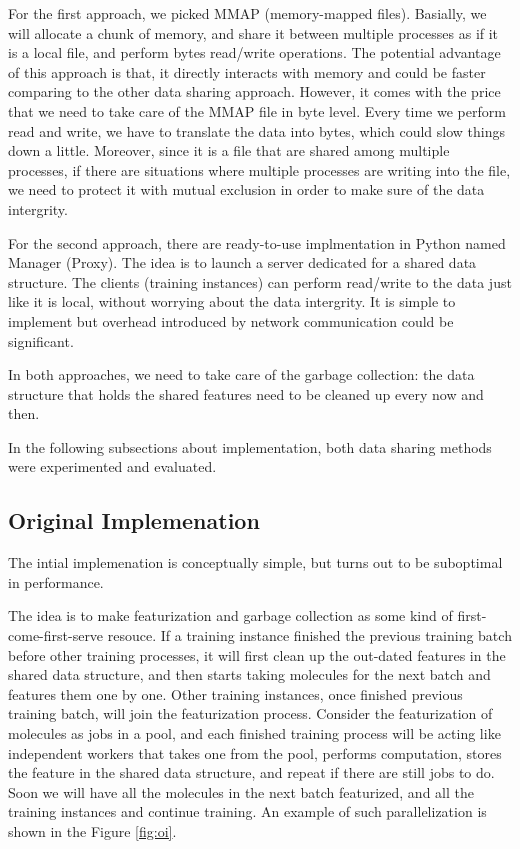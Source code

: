 \documentclass[conference]{IEEEtran}
\begin{document}
For the first approach, we picked MMAP (memory-mapped files). 
Basially, we will allocate a chunk of memory, and share it between multiple processes as if it is a local file, and perform bytes read/write operations. 
The potential advantage of this approach is that, it directly interacts with memory and could be faster comparing to the other data sharing approach. 
However, it comes with the price that we need to take care of the MMAP file in byte level. Every time we perform read and write, we have to translate the data into bytes, which could slow things down a little. 
Moreover, since it is a file that are shared among multiple processes, if there are situations where multiple processes are writing into the file, we need to protect it with mutual exclusion in order to make sure of the data intergrity. 

For the second approach, there are ready-to-use implmentation in Python named Manager (Proxy). 
The idea is to launch a server dedicated for a shared data structure. 
The clients (training instances) can perform read/write to the data just like it is local, without worrying about the data intergrity. 
It is simple to implement but overhead introduced by network communication could be significant. 

In both approaches, we need to take care of the garbage collection: the data structure that holds the shared features need to be cleaned up every now and then.

In the following subsections about implementation, both data sharing methods were experimented and evaluated.


\subsection{Original Implemenation} \label{subsec_oi}

The intial implemenation is conceptually simple, but turns out to be suboptimal in performance. 

The idea is to make featurization and garbage collection as some kind of first-come-first-serve resouce. 
If a training instance finished the previous training batch before other training processes, it will first clean up the out-dated features in the shared data structure, and then starts taking molecules for the next batch and features them one by one. 
Other training instances, once finished previous training batch, will join the featurization process. 
Consider the featurization of molecules as jobs in a pool, and each finished training process will be acting like independent workers that takes one from the pool, performs computation, stores the feature in the shared data structure, and repeat if there are still jobs to do.
Soon we will have all the molecules in the next batch featurized, and all the training instances and continue training. 
An example of such parallelization is shown in the Figure \ref{fig:oi}. 
\end{document}
